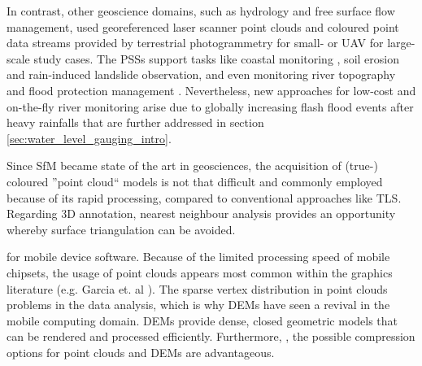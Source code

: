 \documentclass[review]{elsarticle}
\begin{document}
In contrast, other geoscience domains, such as hydrology and free surface flow management, used georeferenced laser scanner point clouds and coloured point data streams provided by terrestrial photogrammetry for small- or \gls{UAV} for large-scale study cases.  The \glspl{PSS} support tasks like coastal monitoring \cite{Letortu2017, Medjkane2018}, soil erosion and rain-induced landslide observation, and even monitoring river topography \cite{Watanabe2016} and flood protection management \cite{Leskens2015}. Nevertheless, new approaches for low-cost and on-the-fly river monitoring \cite{Kroehnert2017a} arise due to globally increasing flash flood events after heavy rainfalls \cite{Mueller2011} that are further addressed in section \ref{sec:water_level_gauging_intro}.
 
Since \gls{SfM} became state of the art in geosciences, the acquisition of (true-) coloured ''point cloud`` models is not that difficult and commonly employed because of its rapid processing, compared to conventional approaches like \gls{TLS}. Regarding 3D annotation, nearest neighbour analysis provides an opportunity whereby surface triangulation can be avoided.


 for mobile device software. Because of the limited processing speed of mobile chipsets, the usage of point clouds appears most common within the graphics literature (e.g. Garcia et. al \cite{Garcia2015}). The sparse vertex distribution in point clouds  problems in the data analysis, which is why \glspl{DEM} have seen a revival in the mobile computing domain. \Glspl{DEM} provide dense, closed geometric models that can be rendered and processed efficiently. Furthermore, , the possible compression options for point clouds and \glspl{DEM} are advantageous. %
\end{document}
